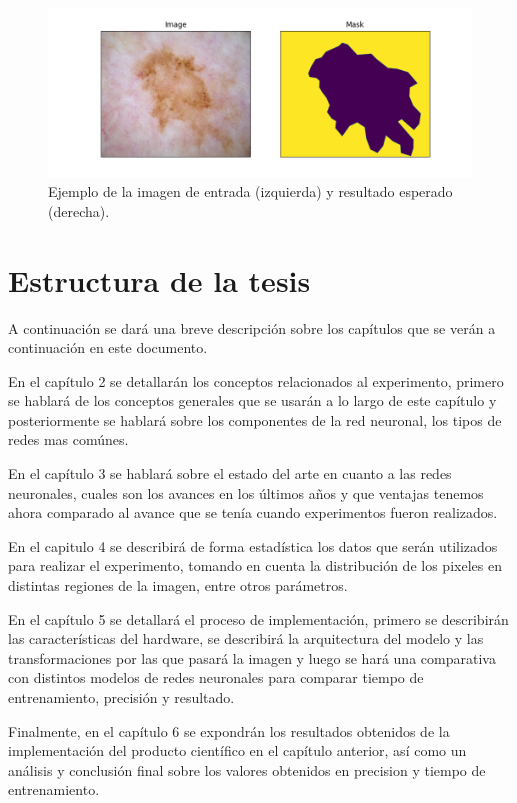 \begin{figure}
    \includegraphics[width=150mm]{Figuras/plot_masks.png}
    \centering
    \caption{Ejemplo de la imagen de entrada (izquierda) y resultado esperado (derecha).}
\end{figure}

\section{Estructura de la tesis}

A continuación se dará una breve descripción sobre los capítulos que se verán a continuación en este documento.

En el capítulo 2 se detallarán los conceptos relacionados al experimento, primero se hablará de los conceptos generales que se usarán a lo largo de este capítulo y posteriormente se hablará sobre los componentes de la red neuronal, los tipos de redes mas comúnes. 

En el capítulo 3 se hablará sobre el estado del arte en cuanto a las redes neuronales, cuales son los avances en los últimos años y que ventajas tenemos ahora comparado al avance que se tenía cuando experimentos fueron realizados.

En el capitulo 4 se describirá de forma estadística los datos que serán utilizados para realizar el experimento, tomando en cuenta la distribución de los pixeles en distintas regiones de la imagen, entre otros parámetros. 

En el capítulo 5 se detallará el proceso de implementación, primero se describirán las características del hardware, se describirá la arquitectura del modelo y las transformaciones por las que pasará la imagen y luego se hará una comparativa con distintos modelos de redes neuronales para comparar tiempo de entrenamiento, precisión y resultado.

Finalmente, en el capítulo 6 se expondrán los resultados obtenidos de la implementación del producto científico en el capítulo anterior, así como un análisis y conclusión final sobre los valores obtenidos en precision y tiempo de entrenamiento. 

